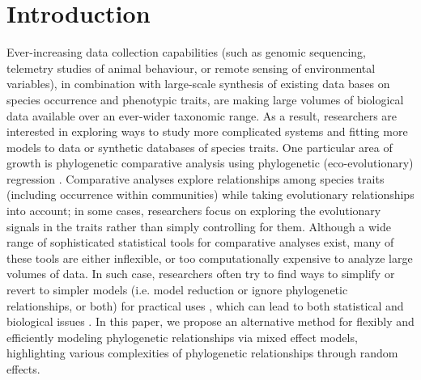 \section{Introduction}

Ever-increasing data collection capabilities (such as genomic sequencing, telemetry studies of animal behaviour, or remote sensing of environmental variables), in combination with large-scale synthesis of existing data bases on species occurrence and phenotypic traits, are making large volumes of biological data available over an ever-wider taxonomic range.
As a result, researchers are interested in exploring ways to study more complicated systems and fitting more models to data or synthetic databases of species traits.
One particular area of growth is phylogenetic comparative analysis using phylogenetic (eco-evolutionary) regression \cite{hansen2012interpreting}. 
Comparative analyses explore relationships among species traits (including occurrence within communities) while taking evolutionary relationships into account; in some cases, researchers focus on exploring the evolutionary signals in the traits rather than simply controlling for them.
Although a wide range of sophisticated statistical tools for comparative analyses exist, many of these tools are either inflexible, or too computationally expensive to analyze large volumes of data.
In such case, researchers often try to find ways to simplify or revert to simpler models (i.e. model reduction or ignore phylogenetic relationships, or both) for practical uses \cite{bunnefeld2012island, ord2010adaptation},
which can lead to both statistical and biological issues \cite{felsenstein1985phylogenies, li2017statistical}. 
In this paper, we propose an alternative method for flexibly and efficiently modeling phylogenetic relationships via mixed effect models, highlighting various complexities of phylogenetic relationships through random effects.

